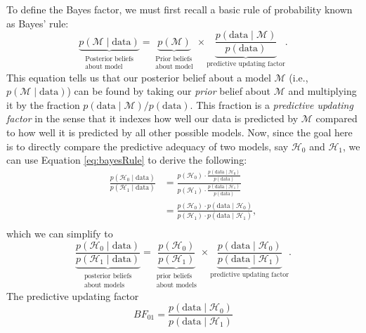 \documentclass[english,,doc,floatsintext]{apa6}
\begin{document}
To define the Bayes factor, we must first recall a basic rule of probability known as Bayes' rule:
\begin{equation}\label{eq:bayesRule}
\underbrace{p(\mathcal{M}\mid \text{data})}_{\substack{\text{Posterior beliefs}\\ \text{about model}}} = \underbrace{p(\mathcal{M})}_{\substack{\text{Prior beliefs}\\ \text{about model}}} \times \underbrace{\frac{p(\text{data}\mid \mathcal{M})}{p(\text{data})}}_{\text{predictive updating factor}}.
\end{equation}
This equation tells us that our posterior belief about a model \(\mathcal{M}\) (i.e., \(p(\mathcal{M}\mid \text{data})\)) can be found by taking our \emph{prior} belief about \(\mathcal{M}\) and multiplying it by the fraction \(p(\text{data}\mid \mathcal{M})/p(\text{data})\). This fraction is a \emph{predictive updating factor} in the sense that it indexes how well our data is predicted by \(\mathcal{M}\) compared to how well it is predicted by all other possible models. Now, since the goal here is to directly compare the predictive adequacy of two models, say \(\mathcal{H}_0\) and \(\mathcal{H}_1\), we can use Equation \ref{eq:bayesRule} to derive the following:
\begin{align*}
  \frac{p(\mathcal{H}_0\mid \text{data})}{p(\mathcal{H}_1\mid \text{data})}
  & = \frac{p(\mathcal{H}_0) \cdot \frac{p(\text{data}\mid \mathcal{H}_0)}{p(\text{data})}}{p(\mathcal{H}_1) \cdot  \frac{p(\text{data}\mid \mathcal{H}_1)}{p(\text{data})}} \\ 
  & = \frac{p(\mathcal{H}_0)\cdot p(\text{data}\mid \mathcal{H}_0)}{p(\mathcal{H}_1)\cdot p(\text{data}\mid \mathcal{H}_1)},\\
\end{align*}
which we can simplify to
\begin{equation}\label{eq:bayesFactor}
\underbrace{\frac{p(\mathcal{H}_0\mid \text{data})}{p(\mathcal{H}_1\mid \text{data})}}_{\substack{\text{posterior beliefs}\\ \text{about models}}} = \underbrace{\frac{p(\mathcal{H}_0)}{p(\mathcal{H}_1)}}_{\substack{\text{prior beliefs}\\ \text{about models}}} \times \underbrace{\frac{p(\text{data}\mid \mathcal{H}_0)}{p(\text{data}\mid \mathcal{H}_1)}}_{\text{predictive updating factor}}.
\end{equation}
The predictive updating factor
\[
BF_{01} = \frac{p(\text{data}\mid\mathcal{H}_0)}{p(\text{data}\mid\mathcal{H}_1)}
\]
\end{document}
